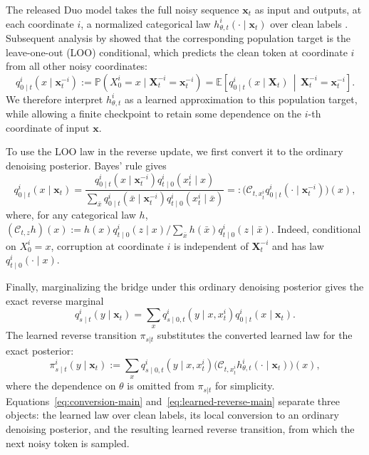 \documentclass{article}
\newcommand{\1}{\mathbf 1}
\theoremstyle{definition}
\begin{document}
The released Duo model takes the full noisy sequence $\bm x_t$ as input and
outputs, at each coordinate $i$, a normalized categorical law
$h_{\theta,t}^i(\cdot\mid\bm x_t)$ over clean labels
\citep{sahoo2025duo}. Subsequent analysis by
\citet{gourevitch2026uniform} showed that the corresponding population target
is the leave-one-out (LOO) conditional, which predicts the clean token at
coordinate $i$ from all other noisy coordinates:
\begin{equation}
 q_{0\mid t}^i(x\mid\bm x_t^{-i})
 :=\mathbb P(X_0^i=x\mid\bm X_t^{-i}=\bm x_t^{-i})
 =\mathbb E\!\left[
 q_{0\mid t}^i(x\mid\bm X_t)
 \,\middle|\,
 \bm X_t^{-i}=\bm x_t^{-i}
 \right].
 \label{eq:loo-main}
\end{equation}
We therefore interpret $h_{\theta,t}^i$ as a learned approximation to this
population target, while allowing a finite checkpoint to retain some
dependence on the $i$-th coordinate of input $\bm{x}$.

To use the LOO law in the reverse update, we first convert it to the ordinary
denoising posterior. Bayes' rule gives
\begin{equation}
 q_{0\mid t}^i(x\mid\bm x_t)
 =\frac{q_{0\mid t}^i(x\mid\bm x_t^{-i})q_{t\mid0}^i(x_t^i\mid x)}
 {\sum_{\bar x}q_{0\mid t}^i(\bar x\mid\bm x_t^{-i})q_{t\mid0}^i(x_t^i\mid\bar x)}
 =:\bigl(\mathcal C_{t,x_t^i}q_{0\mid t}^i(\cdot\mid\bm x_t^{-i})\bigr)(x),
 \label{eq:conversion-main}
\end{equation}
where, for any categorical law $h$,
$(\mathcal C_{t,z}h)(x):=
h(x)q_{t\mid0}^i(z\mid x)/
\sum_{\bar x}h(\bar x)q_{t\mid0}^i(z\mid\bar x)$.
Indeed, conditional on $X_0^i=x$, corruption at coordinate $i$ is independent
of $\bm X_t^{-i}$ and has law $q_{t\mid0}^i(\cdot\mid x)$.

Finally, marginalizing the bridge under this ordinary denoising posterior
gives the exact reverse marginal
\begin{equation}
 q_{s\mid t}^i(y\mid\bm x_t)
 =\sum_x q_{s\mid0,t}^i(y\mid x,x_t^i)
 q_{0\mid t}^i(x\mid\bm x_t).
 \label{eq:exact-reverse-main}
\end{equation}
The learned reverse transition $\pi_{s|t}$ substitutes the converted learned law for the
exact posterior:
\begin{equation}
 \pi_{s\mid t}^i(y\mid\bm x_t)
 :=\sum_x q_{s\mid0,t}^i(y\mid x,x_t^i)
 \bigl(\mathcal C_{t,x_t^i}h_{\theta,t}^i
 (\cdot\mid\bm x_t)\bigr)(x),
 \label{eq:learned-reverse-main}
\end{equation}
where the dependence on $\theta$ is omitted from $\pi_{s|t}$ for simplicity.
Equations~\eqref{eq:conversion-main} and~\eqref{eq:learned-reverse-main} separate
three objects: the learned law over clean labels, its local conversion to an
ordinary denoising posterior, and the resulting learned reverse transition,
from which the next noisy token is sampled.
\end{document}

